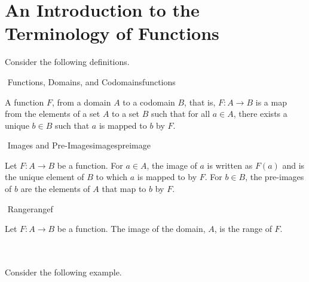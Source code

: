 \section{An Introduction to the Terminology of Functions}

    Consider the following definitions.
    \begin{definition}{\Stop\,\,Functions, Domains, and Codomains}{functions}

        A function \(F\), from a domain \(A\) to a codomain \(B\), that is, \(F:A\to B\) is a map from the elements of a set \(A\) to a set \(B\) such that for all \(a\in A\), there exists a unique \(b\in B\) such that \(a\) is mapped to \(b\) by \(F\).

    \end{definition}
    \begin{definition}{\Stop\,\,Images and Pre-Images}{imagespreimage}

        Let \(F:A\to B\) be a function. For \(a\in A\), the image of \(a\) is written as \(F(a)\) and is the unique element of \(B\) to which \(a\) is mapped to by \(F\). For \(b\in B\), the pre-images of \(b\) are the elements of \(A\) that map to \(b\) by \(F\).

    \end{definition}
    \begin{definition}{\Stop\,\,Range}{rangef}

        Let \(F:A\to B\) be a function. The image of the domain, \(A\), is the range of \(F\).
        
    \end{definition}
    \pagebreak
    \vphantom
    \\
    \\
    Consider the following example.

